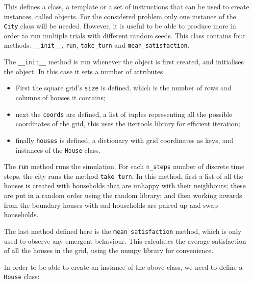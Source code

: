 This defines a class, a template or a set of instructions that can be used to
create instances, called objects.
For the considered problem only one instance of the \texttt{City}
class will be needed.
However, it is useful to be able to produce more in order to run multiple trials
with different random seeds.
This class contains four methods: \texttt{__init__},
\texttt{run}, \texttt{take_turn} and
\texttt{mean_satisfaction}.

The \texttt{__init__} method is run whenever the object is first
created, and initialises the object.
In this case it sets a number of attributes.

\begin{itemize}
     \item First the square grid's \texttt{size} is defined, which
           is the number of rows and columns of houses it contains;
     \item next the \texttt{coords} are defined, a list of tuples
           representing all the possible coordinates of the grid, this uses the
           itertools library for efficient iteration;
     \item finally \texttt{houses} is defined, a dictionary with
           grid coordinates as keys, and instances of the
           \texttt{House} class.
\end{itemize}


The \texttt{run} method runs the simulation. For each
\texttt{n_steps} number of discrete time steps, the city runs the
method \texttt{take_turn}.
In this method, first a list of all the houses is created with households that
are unhappy with their neighbours; these are put in a random order using the
random library; and then working inwards from the boundary
houses with sad households are paired up and swap households.

The last method defined here is the \texttt{mean_satisfaction}
method, which is only used to observe any emergent behaviour.
This calculates the average satisfaction of all the houses in the grid, using
the numpy library for convenience.

In order to be able to create an instance of the above class, we need to define
a \texttt{House} class:

